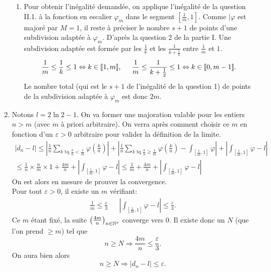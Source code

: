 \begin{enumerate}
\begin{enumerate}
 \item Pour obtenir l'inégalité demandée, on applique l'inégalité de la question II.1. à la fonction en escalier $\varphi_m$ dans le segment $[\frac{1}{m},1]$.\newline
 Comme  $|\varphi$ est majoré par $M=1$, il reste à préciser le nombre $s+1$ de points d'une subdivision adaptée à $\varphi_m$.\newline
 D'après la question 2 de la partie I. Une subdivision adaptée est formée par les $\frac{1}{k}$ et les $\frac{1}{k+\frac{1}{2}}$ entre $\frac{1}{m}$ et $1$. 
\[
 \frac{1}{m}\leq \frac{1}{k} \leq 1 \Leftrightarrow k\in \llbracket 1,m\rrbracket, \hspace{0.5cm}
 \frac{1}{m}\leq \frac{1}{k+\frac{1}{2}} \leq 1 \Leftrightarrow k\in \llbracket 0,m-1\rrbracket.
\]
 Le nombre total (qui est le $s+1$ de l'inégalité de la question 1) de points de la subdivision adaptée à $\varphi_m$ est donc $2m$.
\end{enumerate}

 \item Notons $l=2\ln 2-1$. On va former une majoration valable pour les entiers $n>m$ (avec $m$ à priori arbitraire). On verra après comment choisir ce $m$ en fonction d'un $\varepsilon>0$ arbitraire pour valider la définition de la limite.
\begin{multline*}
 \left\vert d_n - l\right\vert
\leq \left\vert \frac{1}{n}\sum_{k\text{ tq }\frac{k}{n}<\frac{1}{m}}\varphi(\frac{k}{n})\right\vert
    + \left\vert \frac{1}{n}\sum_{k\text{ tq }\frac{k}{n}\geq\frac{1}{m}}\varphi(\frac{k}{n})
                 -\int_{[\frac{1}{m},1]}\varphi \right\vert
    +\left\vert \int_{[\frac{1}{m},1]}\varphi -l\right\vert \\
\leq \frac{1}{n}\times \frac{n}{m}\times 1 + \frac{4m}{n} + \left\vert \int_{[\frac{1}{m},1]}\varphi -l\right\vert 
\leq \frac{1}{m} + \frac{4m}{n} + \left\vert \int_{[\frac{1}{m},1]}\varphi -l\right\vert
\end{multline*}
On est alors en mesure de prouver la convergence.\\
Pour tout $\varepsilon>0$, il existe un $m$ vérifiant:
\begin{align*}
  \frac{1}{m}\leq \frac{\varepsilon}{3}
 & & \left\vert \int_{[\frac{1}{m},1]}\varphi -l\right\vert \leq \frac{\varepsilon}{3}.
\end{align*}
Ce $m$ étant fixé, la suite $\left(\frac{4m}{n}\right) _{n\in \mathbb{N}^*}$ converge vers $0$. Il existe donc un $N$ (que l'on prend $\geq m$) tel que
\begin{displaymath}
 n\geq N \Rightarrow \frac{4m}{n} \leq \frac{\varepsilon}{3}.
\end{displaymath}
On aura bien alors
\begin{displaymath}
 n\geq N \Rightarrow \left\vert d_n - l\right\vert \leq \varepsilon.
\end{displaymath}
\end{enumerate}
